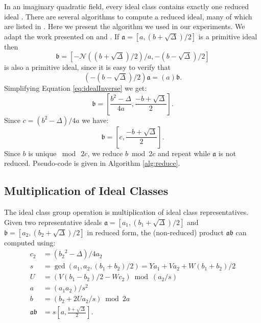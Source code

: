 \documentclass{ucalgthes1}
\theoremstyle{definition}
\begin{document}
In an imaginary quadratic field, every ideal class contains exactly one reduced ideal \cite[p.20]{Ramachandran2006}.  There are several algorithms to compute a reduced ideal, many of which are listed in \cite{Jacobson2006}.  Here we present the algorithm we used in our experiments.  We adapt the work presented on \cite[p.90]{Jacobson2006} and \cite[p.99]{Jacobson2009}. If $\mathfrak a = [a, (b + \sqrt\Delta)/2]$ is a primitive ideal then 
\begin{equation}
\label{eq:idealInverse}
	\mathfrak b = \left[ -\mathcal N((b + \sqrt\Delta)/2)/a, -(b - \sqrt\Delta)/2 \right]
\end{equation}
is also a primitive ideal, since it is easy to verify that
\[
	\left(-(b - \sqrt\Delta)/2 \right) \mathfrak a = (a) \mathfrak b.
\]
Simplifying Equation \ref{eq:idealInverse} we get:
\[
	\mathfrak b = \left[ \frac{b^2-\Delta}{4a}, \frac{-b + \sqrt\Delta}{2} \right].
\]
Since $c = (b^2 - \Delta)/4a$ we have:
\[
	\mathfrak b = \left[ c, \frac{-b + \sqrt\Delta}{2} \right].
\]
Since $b$ is unique $\bmod{~2c}$, we reduce $b \bmod{2c}$ and repeat while $\mathfrak a$ is not reduced.  Pseudo-code is given in Algorithm \ref{alg:reduce}.


\subsection{Multiplication of Ideal Classes}
\label{subsec:idealMultiply}

The ideal class group operation is multiplication of ideal class representatives. Given two representative ideals $\mathfrak a = [a_1, (b_1 + \sqrt{\Delta})/2]$ and $\mathfrak b = [a_2, (b_2 + \sqrt{\Delta})/2]$ in reduced form, the (non-reduced) product $\mathfrak a \mathfrak b$ can computed using:
\begin{align}
	c_2 & = ({b_2}^2-\Delta)/4a_2 \\
	s & = \gcd(a_1, a_2, (b_1+b_2)/2) = Ya_1 + Va_2 + W(b_1+b_2)/2    \label{eq:idealProductS} \\
	U & = (V(b_1-b_2)/2 - Wc_2) \bmod{(a_2/s)}                        \label{eq:idealProductU} \\
	a & = (a_1a_2)/s^2                                                \label{eq:idealProductA} \\
	b & = (b_2 + 2Ua_2/s) \bmod{2a}                                   \label{eq:idealProductB} \\
	\mathfrak a \mathfrak b & = s\left[a, \frac{b + \sqrt{\Delta}}{2}\right].
\end{align}
\end{document}

